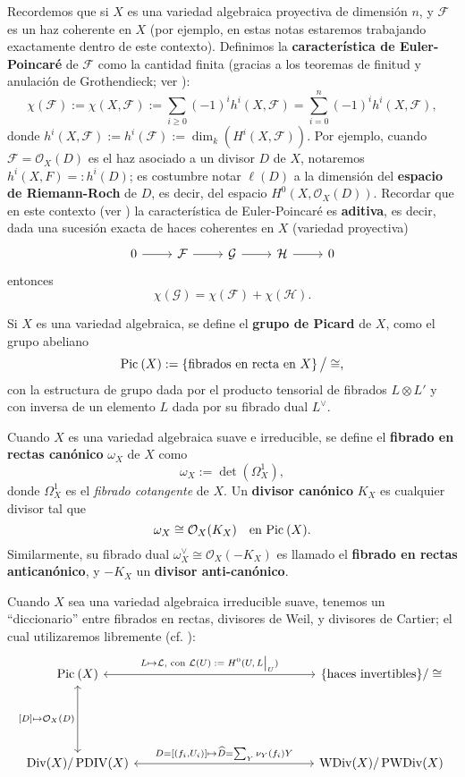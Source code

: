 \documentclass[spanish,12pt]{amsart}
\newcommand{\Pic}[1]{\textup{Pic}{ \: (#1)}}
\theoremstyle{definition}
\theoremstyle{remark}
\numberwithin{equation}{section}
\renewcommand{\hat}[1]{\widehat{#1}}
\newcommand\rest[2]{{%
  \left.\kern-\nulldelimiterspace %
  #1 %
  \vphantom{\big|} %
  \right|_{#2} %
  }}
\renewcommand{\O}{\mathcal{O}}
\begin{document}
Recordemos que si $X$ es una variedad algebraica proyectiva de dimensión $n$, y $\mathcal F$ es un haz coherente en $X$ (por ejemplo, en estas notas estaremos trabajando exactamente dentro de este contexto). Definimos la \textbf{característica de Euler-Poincaré} de $\mathcal F$ como la cantidad finita (gracias a los teoremas de finitud y anulación de Grothendieck; ver \cite[\S 5]{notas_pedro}):
\[
    \chi (\mathcal F) := \chi (X, \mathcal F) := \sum_{i \geq 0} (-1)^i h^i(X, \mathcal F)  = \sum_{i =0}^n (-1)^i h^i(X, \mathcal F),
\]
donde $h^i (X, \mathcal F) := h^i (\mathcal F) := \dim_k (H^i (X, \mathcal F))$. Por ejemplo, cuando $\mathcal F = \O_X (D)$ es el haz asociado a un divisor $D$ de $X$, notaremos $h^i (X, F) =: h^i (D)$; es costumbre notar $\ell (D)$ a la dimensión del \textbf{espacio de Riemann-Roch} de $D$, es decir, del espacio $H^0 (X, \O_X (D))$. Recordar que en este contexto (ver \cite[Lema 5.2.5]{notas_pedro}) la característica de Euler-Poincaré es \textbf{aditiva}, es decir, dada una sucesión exacta de haces coherentes en $X$ (variedad proyectiva)
\[
    \begin{tikzcd}
    0 \ar{r} & \mathcal F \ar{r} & \mathcal G \ar{r} & \mathcal H \ar{r} & 0
    \end{tikzcd}
\]
entonces
\[
    \chi (\mathcal G) = \chi (\mathcal F) + \chi (\mathcal H).
\]

Si $X$ es una variedad algebraica, se define el \textbf{grupo de Picard} de $X$, como el grupo abeliano
\[
    \Pic X := \left \{\text{fibrados en recta en $X$}\right \}\big/\cong,
\]
con la estructura de grupo dada por el producto tensorial de fibrados $L \otimes L'$ y con inversa de un elemento $L$ dada por su fibrado dual $L^\vee$.

Cuando $X$ es una variedad algebraica suave e irreducible, se define el \textbf{fibrado en rectas canónico} $\omega_X$ de $X$ como
\[
    \omega_X := \det (\Omega_X^1),
\]
donde $\Omega_X^1$ es el \textit{fibrado cotangente} de $X$. Un \textbf{divisor canónico} $K_X$ es cualquier divisor tal que
\[
    \omega_X \cong \O_X (K_X) \quad \text{en $\Pic X$}.
\]
Similarmente, su fibrado dual $\omega_X^\vee \cong \O_X (-K_X)$ es llamado el \textbf{fibrado en rectas anticanónico}, y $-K_X$ un \textbf{divisor anti-canónico}.


Cuando $X$ sea una variedad algebraica irreducible suave, tenemos un ``diccionario'' entre fibrados en rectas, divisores de Weil, y divisores de Cartier; el cual utilizaremos libremente (cf. \cite[\S 3]{notas_pedro}):
\[
    \begin{tikzcd}
    \Pic X \ar[leftrightarrow]{rrrrrr}{L \mapsto \mathcal L, \text{ con $\mathcal L (U) := H^0 (U, \rest L U)$}} &&&&&& \{\text{haces invertibles}\}/\cong \\
    \\
    \\
    \operatorname{Div} (X) /\operatorname{PDIV} (X) \ar[leftrightarrow]{uuu}{[D] \mapsto \O_X (D)} \ar[leftrightarrow]{rrrrrr}{D = [(f_i, U_i)] \mapsto \hat D = \sum_Y \nu_Y (f_i) Y} &&&&&& \operatorname{WDiv} (X) /\operatorname{PWDiv} (X)
    \end{tikzcd}
\]
\end{document}
